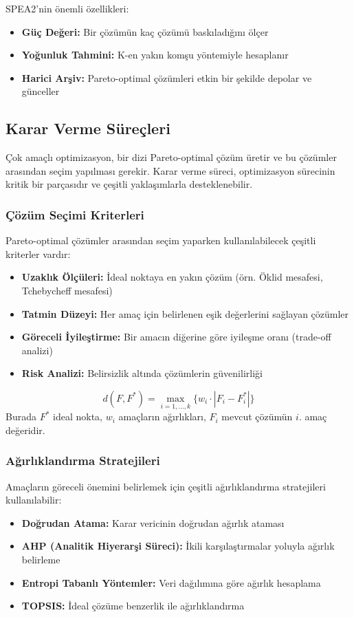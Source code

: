 SPEA2'nin önemli özellikleri:
\begin{itemize}
    \item \textbf{Güç Değeri:} Bir çözümün kaç çözümü baskıladığını ölçer
    \item \textbf{Yoğunluk Tahmini:} K-en yakın komşu yöntemiyle hesaplanır
    \item \textbf{Harici Arşiv:} Pareto-optimal çözümleri etkin bir şekilde depolar ve günceller
\end{itemize}

\subsection{Karar Verme Süreçleri}
Çok amaçlı optimizasyon, bir dizi Pareto-optimal çözüm üretir ve bu çözümler arasından seçim yapılması gerekir. Karar verme süreci, optimizasyon sürecinin kritik bir parçasıdır ve çeşitli yaklaşımlarla desteklenebilir.

\subsubsection{Çözüm Seçimi Kriterleri}
Pareto-optimal çözümler arasından seçim yaparken kullanılabilecek çeşitli kriterler vardır:
\begin{itemize}
    \item \textbf{Uzaklık Ölçüleri:} İdeal noktaya en yakın çözüm (örn. Öklid mesafesi, Tchebycheff mesafesi)
    \item \textbf{Tatmin Düzeyi:} Her amaç için belirlenen eşik değerlerini sağlayan çözümler
    \item \textbf{Göreceli İyileştirme:} Bir amacın diğerine göre iyileşme oranı (trade-off analizi)
    \item \textbf{Risk Analizi:} Belirsizlik altında çözümlerin güvenilirliği
\end{itemize}

\begin{tcolorbox}[title=Örnek: Ağırlıklı Tchebycheff Metriği]
\begin{equation}
d(F, F^*) = \max_{i=1,...,k} \{w_i \cdot |F_i - F_i^*|\}
\end{equation}
Burada $F^*$ ideal nokta, $w_i$ amaçların ağırlıkları, $F_i$ mevcut çözümün $i$. amaç değeridir.
\end{tcolorbox}

\subsubsection{Ağırlıklandırma Stratejileri}
Amaçların göreceli önemini belirlemek için çeşitli ağırlıklandırma stratejileri kullanılabilir:
\begin{itemize}
    \item \textbf{Doğrudan Atama:} Karar vericinin doğrudan ağırlık ataması
    \item \textbf{AHP (Analitik Hiyerarşi Süreci):} İkili karşılaştırmalar yoluyla ağırlık belirleme
    \item \textbf{Entropi Tabanlı Yöntemler:} Veri dağılımına göre ağırlık hesaplama
    \item \textbf{TOPSIS:} İdeal çözüme benzerlik ile ağırlıklandırma
\end{itemize}

